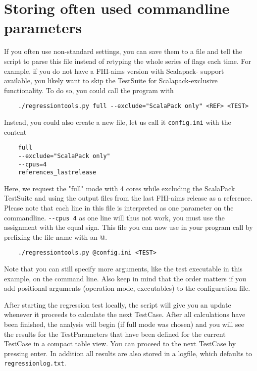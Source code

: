 \documentclass[a4paper,12pt]{scrartcl}
\begin{document}
\section{Storing often used commandline parameters}
If you often use non-standard settings, you can save them to a file and tell the script to parse this file instead of
retyping the whole series of flags each time. For example, if you do not have a FHI-aims version with Scalapack-
support available, you likely want to skip the TestSuite for Scalapack-exclusive functionality. To do so, you could
call the program with
\begin{verbatim}
    ./regressiontools.py full --exclude="ScalaPack only" <REF> <TEST>
\end{verbatim}
Instead, you could also create a new file, let us call it \texttt{config.ini} with the content
\begin{verbatim}
    full
    --exclude="ScalaPack only"
    --cpus=4
    references_lastrelease
\end{verbatim}
Here, we request the "full" mode with 4 cores while excluding the ScalaPack TestSuite and using the output files
from the last FHI-aims release as a reference.
Please note that each line in this file is interpreted as one parameter on the commandline.
\verb|--cpus 4| as one line will thus not work, you must use the assignment with the equal sign.
This file you can now use in your program call by prefixing the file name with an @.
\begin{verbatim}
    ./regressiontools.py @config.ini <TEST>
\end{verbatim}
Note that you can still specify more arguments, like the test executable in this example, on the command line. Also
keep in mind that the order matters if you add positional arguments (operation mode, executables) to the
configuration file.

After starting the regression test locally, the script will give you an update whenever it proceeds to calculate the
next TestCase. After all calculations have been finished, the analysis will begin (if full mode was chosen) and you
will see the results for the TestParameters that have been defined for the current TestCase in a compact table view.
You can proceed to the next TestCase by pressing enter. In addition all results are also stored in a logfile, which
defaults to \texttt{regressionlog.txt}.
\end{document}
